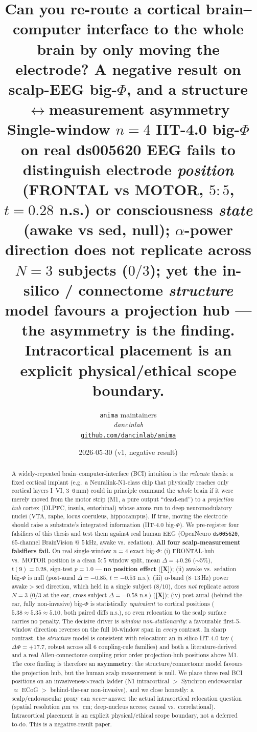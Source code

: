 \documentclass[11pt,a4paper]{article}
\title{
  \textbf{Can you re-route a cortical brain--computer interface to the
  whole brain by only moving the electrode? A negative result on
  scalp-EEG big-$\Phi$, and a structure$\leftrightarrow$measurement
  asymmetry}\\[6pt]
  \large Single-window $n{=}4$ IIT-4.0 big-$\Phi$ on real
  ds005620 EEG fails to distinguish electrode \emph{position}
  (FRONTAL vs MOTOR, $5{:}5$, $t{=}0.28$ n.s.) or consciousness
  \emph{state} (awake vs sed, null); $\alpha$-power direction does not
  replicate across $N{=}3$ subjects ($0/3$); yet the in-silico /
  connectome \emph{structure} model favours a projection hub --- the
  asymmetry is the finding. Intracortical placement is an explicit
  physical/ethical scope boundary.
}
\author{
  \texttt{anima} maintainers\\
  \normalsize\textit{dancinlab}\\[2pt]
  \normalsize\href{https://github.com/dancinlab/anima}{\texttt{github.com/dancinlab/anima}}
}
\date{2026-05-30 (v1, negative result)}
\providecommand{\tierRed}{\textbf{[X]}}     %
\newcommand{\bphi}{\ensuremath{\Phi}}
\begin{document}
\maketitle

\begin{abstract}
A widely-repeated brain--computer-interface (BCI) intuition is the
\emph{relocate} thesis: a fixed cortical implant (e.g.\ a Neuralink-N1-class
chip that physically reaches only cortical layers I--VI, $3$--$6\,$mm) could in
principle command the \emph{whole} brain if it were merely moved from the
motor strip (M1, a pure output ``dead-end'') to a \emph{projection hub} cortex
(DLPFC, insula, entorhinal) whose axons run to deep neuromodulatory nuclei
(VTA, raphe, locus coeruleus, hippocampus). If true, moving the electrode
should raise a substrate's integrated information (IIT-4.0 big-$\Phi$). We
pre-register four falsifiers of this thesis and test them against real human
EEG (OpenNeuro \texttt{ds005620}, $65$-channel BrainVision @ $5\,$kHz, awake
vs.\ sedation). \textbf{All four scalp-measurement falsifiers fail.} On real
single-window $n{=}4$ exact big-$\Phi$: (i) FRONTAL-hub vs.\ MOTOR position is a
clean $5{:}5$ window split, mean $\Delta{=}{+}0.26$ ($\sim$5\%), $t(9){=}0.28$,
sign-test $p{=}1.0$ --- \textbf{no position effect} (\tierRed); (ii) awake vs.\
sedation big-$\Phi$ is null (post-aural $\Delta{=}{-}0.85$, $t{=}{-}0.53$ n.s.);
(iii) $\alpha$-band ($8$--$13\,$Hz) power awake$>$sed direction, which held in a
single subject ($8/10$), does \emph{not} replicate across $N{=}3$ ($0/3$ at the
ear, cross-subject $\Delta{=}{-}0.58$ n.s.) (\tierRed); (iv) post-aural
(behind-the-ear, fully non-invasive) big-$\Phi$ is statistically
\emph{equivalent} to cortical positions ($5.38{\approx}5.35{\approx}5.10$, both
paired diffs n.s.), so even relocation to the scalp surface carries no penalty.
The decisive driver is \emph{window non-stationarity}: a favourable first-5-window
direction reverses on the full 10-window span in \emph{every} contrast.
In sharp contrast, the \emph{structure} model is consistent with relocation:
an in-silico IIT-4.0 toy ($\Delta\bphi{=}{+}17.7$, robust across all 6
coupling-rule families) and both a literature-derived and a real
Allen-connectome coupling prior order projection-hub positions above M1. The
core finding is therefore an \textbf{asymmetry}: the structure/connectome model
favours the projection hub, but the human scalp measurement is null. We place
three real BCI positions on an invasiveness$\times$reach ladder
(N1 intracortical $>$ Synchron endovascular $\approx$ ECoG $>$ behind-the-ear
non-invasive), and we close honestly: a scalp/endovascular proxy can
\emph{never} answer the actual intracortical relocation question (spatial
resolution $\mu$m vs.\ cm; deep-nucleus access; causal vs.\ correlational).
Intracortical placement is an explicit physical/ethical scope boundary, not a
deferred to-do. This is a negative-result paper.
\end{abstract}
\end{document}
